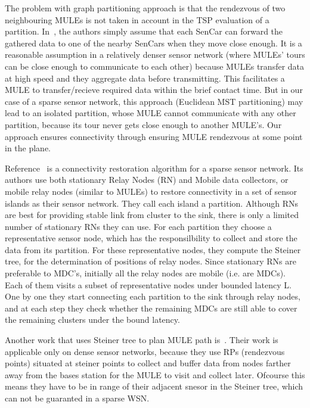 The problem with graph partitioning approach is that the rendezvous of two neighbouring MULEs is not taken in account in the TSP evaluation of a partition. In~\cite{sim4}, the authors simply assume that each SenCar can forward the gathered data to one of the nearby SenCars when they move close enough. It is a reasonable assumption in a relatively denser sensor network (where MULEs' tours can be close enough to communicate to each other) because MULEs transfer data at high speed and they aggregate data before transmitting. This facilitates a MULE to transfer/recieve required data within the brief contact time. But in our case of a sparse sensor network, this approach  (Euclidean MST partitioning) may lead to an isolated partition, whose MULE cannot communicate with any other partition, because its tour never gets close enough to another MULE's. Our approach ensures connectivity through ensuring MULE rendezvous at some point in the plane.

Reference~\cite{sim3} is a connectivity restoration algorithm for a sparse sensor network. Its authors use both stationary Relay Nodes (RN) and Mobile data collectors, or mobile relay nodes (similar to MULEs) to restore connectivity in a set of sensor islands as their sensor network. They call each island a partition. Although RNs are best for providing stable link from cluster to the sink, there is only a limited number of stationary RNs they can use. For each partition they choose a representative sensor node, which has the responsilbility to collect and store the data from its partition. For these representative nodes, they compute the Steiner tree, for the determination of positions of relay nodes. Since stationary RNs are preferable to MDC's, initially all the relay nodes are mobile (i.e. are MDCs). Each of them visits a subset of representative nodes under bounded latency L. One by one they start connecting each partition to the sink through relay nodes, and at each step they check whether the remaining MDCs are still able to cover the remaining clusters under the bound latency.

Another work that uses Steiner tree to plan MULE path is~\cite{rendezvous}. Their work is applicable only on dense sensor networks, because they use RPs (rendezvous points) situated at steiner points to collect and buffer data from nodes farther away from the bases station for the MULE to visit and collect later. Ofcourse this means they have to be in range of their adjacent snesor in the Steiner tree, which can not be guaranted in a sparse WSN.
